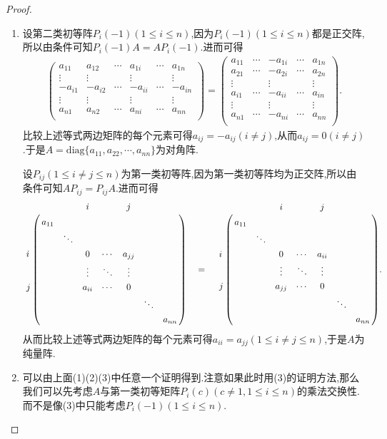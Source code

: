 \documentclass[../../main.tex]{subfiles}%
\begin{document}
\begin{proof}
\begin{enumerate}
\item 设第二类初等阵\(P_{i}(-1)(1\leqslant  i\leqslant  n)\),因为$P_{i}(-1)(1\leqslant  i\leqslant  n)$都是正交阵,所以由条件可知$P_{i}(-1)A=AP_{i}(-1)$.进而可得
\begin{align*}
\left( \begin{matrix}
a_{11}&		a_{12}&		\cdots&		a_{1i}&		\cdots&		a_{1n}\\
\vdots&		\vdots&		&		\vdots&		&		\vdots\\
-a_{i1}&		-a_{i2}&		\cdots&		-a_{ii}&		\cdots&		-a_{in}\\
\vdots&		\vdots&		&		\vdots&		&		\vdots\\
a_{n1}&		a_{n2}&		\cdots&		a_{ni}&		\cdots&		a_{nn}\\
\end{matrix} \right) =\left( \begin{matrix}
a_{11}&		\cdots&		-a_{1i}&		\cdots&		a_{1n}\\
a_{21}&		\cdots&		-a_{2i}&		\cdots&		a_{2n}\\
\vdots&		&		\vdots&		&		\vdots\\
a_{i1}&		\cdots&		-a_{ii}&		\cdots&		a_{in}\\
\vdots&		&		\vdots&		&		\vdots\\
a_{n1}&		\cdots&		-a_{ni}&		\cdots&		a_{nn}\\
\end{matrix} \right) .
\end{align*}
比较上述等式两边矩阵的每个元素可得$a_{ij}=-a_{ij}\left( i\ne j \right) $,从而$a_{ij}=0\left( i\ne j \right) $.于是\(A=\text{diag}\{a_{11},a_{22},\cdots,a_{nn}\}\)为对角阵.

设\(P_{ij}(1\leqslant  i\neq j\leqslant  n)\)为第一类初等阵,因为第一类初等阵均为正交阵,所以由条件可知\(AP_{ij}=P_{ij}A\).进而可得
\begin{align*}
\bordermatrix{%
&    &		&		i&		&		j&		&		\cr
&    a_{11}&		&		&		&		&		&		\cr
&    &		\ddots&		&		&		&		&		\cr
i&    &		&		0&		\cdots&		a_{jj}&		&		\cr
&   &		&		\vdots&		\ddots&		\vdots&		&		\cr
j&    &		&		a_{ii}&		\cdots&		0&		&		\cr
&    &		&		&		&		&		\ddots&		\cr
&    &		&		&		&		&		&		a_{nn}\cr
} \quad =\quad \bordermatrix{%
&    &		&		i&		&		j&		&		\cr
&    a_{11}&		&		&		&		&		&		\cr
&    &		\ddots&		&		&		&		&		\cr
i&    &		&		0&		\cdots&		a_{ii}&		&		\cr
&    &		&		\vdots&		\ddots&		\vdots&		&		\cr
j&   &		&		a_{jj}&		\cdots&		0&		&		\cr
&    &		&		&		&		&		\ddots&		\cr
&    &		&		&		&		&		&		a_{nn}\cr
} .
\end{align*}
从而比较上述等式两边矩阵的每个元素可得\(a_{ii}=a_{jj}(1\leqslant  i\neq j\leqslant  n)\),于是\(A\)为纯量阵.

\item 可以由上面(1)(2)(3)中任意一个证明得到.注意如果此时用(3)的证明方法,那么我们可以先考虑$A$与第一类初等矩阵\(P_{i}(c)(c\ne 1,1\leqslant  i\leqslant  n)\)的乘法交换性.而不是像(3)中只能考虑\(P_{i}(-1)(1\leqslant  i\leqslant  n)\).
\end{enumerate}

\end{proof}
\end{document}
